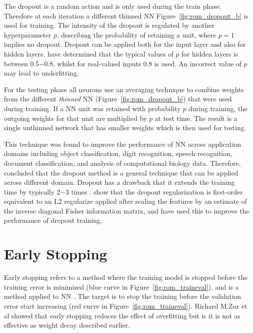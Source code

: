 The dropout is a random action and is only used during the train phase. Therefore at each iteration a different thinned NN Figure~\ref{fig:rom_dropout_b} is used for training. The intensity of the dropout is regulated by another hyperparameter $p$, describing the probability of retaining a unit, where $p=1$ implies no dropout. Dropout can be applied both for the input layer and also for hidden layers. \citet{srivastava2014dropout} have determined that the typical values of $p$ for hidden layers is between 0.5$-$0.8, whilst for real-valued inputs 0.8 is used. An incorrect value of $p$ may lead to underfitting.

For the testing phase all neurons use an averaging technique to combine weights from the different \textit{thinned} NN (Figure~\ref{fig:rom_dropout_b}) that were used during training. If a NN unit was retained with probability $p$ during training, the outgoing weights for that unit are multiplied by $p$ at test time. The result is a single unthinned network that has smaller weights which is then used for testing.

This technique was found to improve the performance of NN across application domains including object classification, digit recognition, speech recognition, document classiﬁcation, and analysis of computational biology data. Therefore, \citet{srivastava2014dropout} concluded that the dropout method is a general technique that can be applied across different domain. Dropout has a drawback that it extends the training time by typically 2$-$3 times \citep{srivastava2014dropout}. \citet{wager2013dropout} show that the dropout regularization is ﬁrst-order equivalent to an L2 regularize applied after scaling the features by an estimate of the inverse diagonal Fisher information matrix, and have used this to improve the performance of dropout training. 



\section{Early Stopping} 

Early stopping refers to a method where the training model is stopped before the training error is minimized (blue curve in Figure~\ref{fig:rom_traineval}), and is a method applied to NN \citep{Sarle95stoppedtraining}. The target is to stop the training before the validation error start increasing (red curve in Figure~\ref{fig:rom_traineval}). Richard M.Zur \citep{zur2009noise} et al showed that early stopping reduces the effect of overfitting but is it is not as effective as weight decay described earlier.





